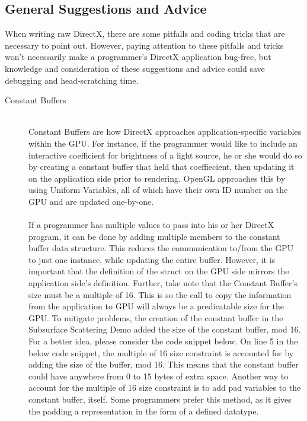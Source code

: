 \documentclass[a4paper, 12pt]{article}
\begin{document}
\subsection{General Suggestions and Advice}

\label{subsection:Suggestions}

When writing raw DirectX, there are some pitfalls and coding tricks that are
necessary to point out. However, paying attention to these pitfalls and tricks
won't necessarily make a programmer's DirectX application bug-free, but
knowledge and consideration of these suggestions and advice could save
debugging and head-scratching time.

\begin{description}

\item[Constant Buffers] \hfill \\

Constant Buffers are how DirectX approaches application-specific variables
within the GPU. For instance, if the programmer would like to include an
interactive coefficient for brightness of a light source, he or she would do
so by creating a constant buffer that held that coeffiecient, then updating it
on the application side prior to rendering. OpenGL approaches this by using
Uniform Variables, all of which have their own ID number on the GPU and are
updated one-by-one. \\ \\ If a programmer has multiple values to pass into his
or her DirectX program, it can be done by adding multiple members to the
constant buffer data structure. This reduces the communication to/from the GPU
to just one instance, while updating the entire buffer. However, it is
important that the definition of the struct on the GPU side mirrors the
application side's definition. Further, take note that the Constant Buffer's
size must be a multiple of 16. This is so the call to copy the information
from the application to GPU will always be a predicatable size for the GPU. To
mitigate problems, the creation of the constant buffer in the Subsurface
Scattering Demo added the size of the constant buffer, mod 16. For a better
idea, please consider the code snippet below. On line 5 in the below code
snippet, the multiple of 16 size constraint is accounted for by adding the
size of the buffer, mod 16. This means that the constant buffer could have
anywhere from 0 to 15 bytes of extra space. Another way to account for the
multiple of 16 size constraint is to add pad variables to the constant buffer,
itself. Some programmers prefer this method, as it gives the padding a
representation in the form of a defined datatype.


\end{description}
\end{document}
